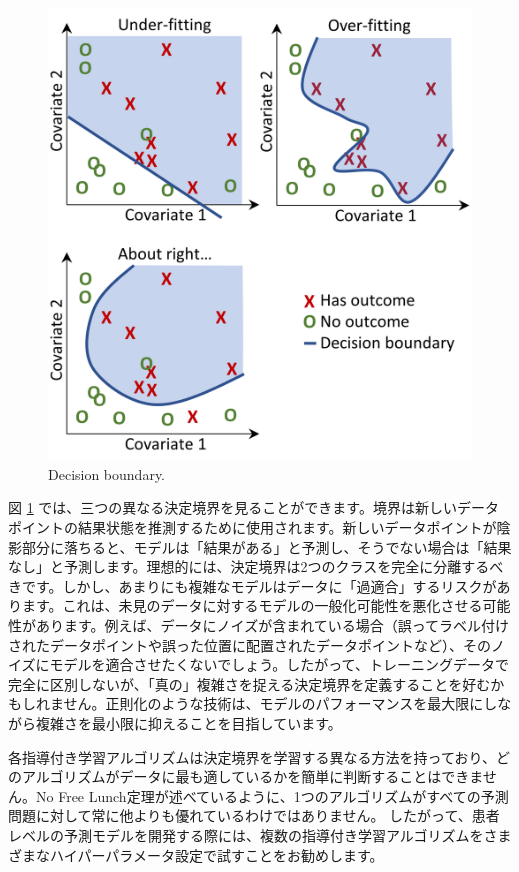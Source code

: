 \documentclass[
  11pt]{book}
\theoremstyle{definition}
\theoremstyle{definition}
\theoremstyle{definition}
\theoremstyle{definition}
\theoremstyle{remark}
\begin{document}
\begin{figure}

{\centering \includegraphics[width=0.8\linewidth]{images/PatientLevelPrediction/decisionBoundary} 

}

\caption{Decision boundary.}\label{fig:decisionBoundary}
\end{figure}

図 \ref{fig:decisionBoundary} では、三つの異なる決定境界を見ることができます。境界は新しいデータポイントの結果状態を推測するために使用されます。新しいデータポイントが陰影部分に落ちると、モデルは「結果がある」と予測し、そうでない場合は「結果なし」と予測します。理想的には、決定境界は2つのクラスを完全に分離するべきです。しかし、あまりにも複雑なモデルはデータに「過適合」するリスクがあります。これは、未見のデータに対するモデルの一般化可能性を悪化させる可能性があります。例えば、データにノイズが含まれている場合（誤ってラベル付けされたデータポイントや誤った位置に配置されたデータポイントなど）、そのノイズにモデルを適合させたくないでしょう。したがって、トレーニングデータで完全に区別しないが、「真の」複雑さを捉える決定境界を定義することを好むかもしれません。正則化のような技術は、モデルのパフォーマンスを最大限にしながら複雑さを最小限に抑えることを目指しています。

各指導付き学習アルゴリズムは決定境界を学習する異なる方法を持っており、どのアルゴリズムがデータに最も適しているかを簡単に判断することはできません。No Free Lunch定理が述べているように、1つのアルゴリズムがすべての予測問題に対して常に他よりも優れているわけではありません。 したがって、患者レベルの予測モデルを開発する際には、複数の指導付き学習アルゴリズムをさまざまなハイパーパラメータ設定で試すことをお勧めします。
\end{document}
